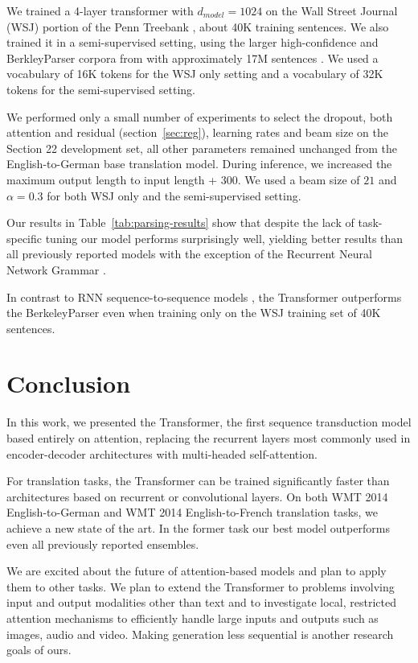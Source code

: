 We trained a 4-layer transformer with $d_{model} = 1024$ on the Wall Street Journal (WSJ) portion of the Penn Treebank \citep{marcus1993building}, about 40K training sentences. We also trained it in a semi-supervised setting, using the larger high-confidence and BerkleyParser corpora from with approximately 17M sentences \citep{KVparse15}. We used a vocabulary of 16K tokens for the WSJ only setting and a vocabulary of 32K tokens for the semi-supervised setting.

We performed only a small number of experiments to select the dropout, both attention and residual (section~\ref{sec:reg}), learning rates and beam size on the Section 22 development set, all other parameters remained unchanged from the English-to-German base translation model. During inference, we increased the maximum output length to input length + $300$. We used a beam size of $21$ and $\alpha=0.3$ for both WSJ only and the semi-supervised setting.

Our results in Table~\ref{tab:parsing-results} show that despite the lack of task-specific tuning our model performs surprisingly well, yielding better results than all previously reported models with the exception of the Recurrent Neural Network Grammar \cite{dyer-rnng:16}.

In contrast to RNN sequence-to-sequence models \citep{KVparse15}, the Transformer outperforms the BerkeleyParser \cite{petrov-EtAl:2006:ACL} even when training only on the WSJ training set of 40K sentences.


\section{Conclusion}
In this work, we presented the Transformer, the first sequence transduction model based entirely on attention, replacing the recurrent layers most commonly used in encoder-decoder architectures with multi-headed self-attention.

For translation tasks, the Transformer can be trained significantly faster than architectures based on recurrent or convolutional layers. On both WMT 2014 English-to-German and WMT 2014 English-to-French translation tasks, we achieve a new state of the art. In the former task our best model outperforms even all previously reported ensembles. 

We are excited about the future of attention-based models and plan to apply them to other tasks. We plan to extend the Transformer to problems involving input and output modalities other than text and to investigate local, restricted attention mechanisms to efficiently handle large inputs and outputs such as images, audio and video.
Making generation less sequential is another research goals of ours.

